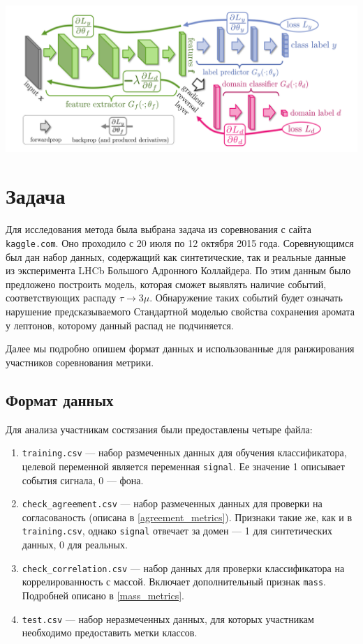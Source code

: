 \documentclass[14pt, a4paper]{extarticle}
\begin{document}
\begin{center}
	\includegraphics[scale=0.4]{images/grl_architecture.png}
\end{center}


\newpage
\section{Задача}
\label{paragraph:task}

Для исследования метода была выбрана задача из соревнования \cite{kaggle_contest} с сайта \texttt{kaggle.com}. Оно проходило с 20 июля по 12 октября 2015 года. Соревнующимся был дан набор данных, содержащий как синтетические, так и реальные данные из эксперимента LHCb Большого Адронного Коллайдера. По этим данным было предложено построить модель, которая сможет выявлять наличие событий, соответствующих распаду $\tau \rightarrow 3\mu$. Обнаружение таких событий будет означать нарушение предсказываемого Стандартной моделью свойства сохранения аромата у лептонов, которому данный распад не подчиняется. 

Далее мы подробно опишем формат данных и использованные для ранжирования участников соревнования метрики.  

\subsection{Формат данных}
Для анализа участникам состязания были предоставлены четыре файла:
\begin{enumerate}
\item \texttt{training.csv} — набор размеченных данных для обучения классификатора, целевой переменной является переменная \texttt{signal}. Ее значение 1 описывает события сигнала, 0 — фона.
\item \texttt{check\_agreement.csv} — набор размеченных данных для проверки на согласованость (описана в \ref{agreement_metrics}). Признаки такие же, как и в \texttt{training.csv}, однако \texttt{signal} отвечает за домен — 1 для синтетических данных, 0 для реальных.
\item \texttt{check\_correlation.csv} — набор данных для проверки классификатора на коррелированность с массой. Включает дополнительный признак \texttt{mass}. Подробней описано в \ref{mass_metrics}.
\item \texttt{test.csv} — набор неразмеченных данных, для которых участникам необходимо предоставить метки классов.
\end{enumerate}
\end{document}
